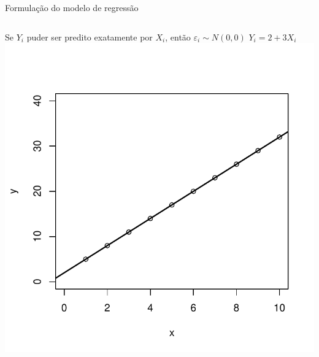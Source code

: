 \documentclass{beamer}\usepackage[]{graphicx}\usepackage[]{color}
\newenvironment{knitrout}{}{} %
\renewenvironment{knitrout}{\setlength{\topsep}{0mm}}{}
\begin{document}
\begin{frame}{Formulação do modelo de regressão}

\begin{columns}[c]

Se $Y_i$ puder ser predito exatamente por $X_i$, então $\varepsilon _i \sim N(0,0)$
\vfill
$Y_i = 2 + 3X_i$
\vfill
\begin{knitrout}
\color{fgcolor}
\includegraphics[width=1\linewidth]{figure/ezero-1} 

\end{knitrout}



\end{columns}
\end{frame}
\end{document}
